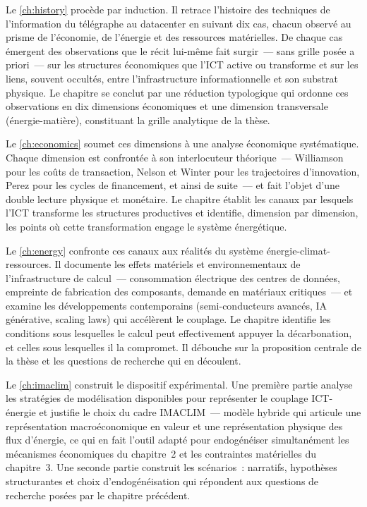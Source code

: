 Le \autoref{ch:history} procède par induction. Il retrace l'histoire des techniques de l'information du télégraphe au datacenter en suivant dix cas, chacun observé au prisme de l'économie, de l'énergie et des ressources matérielles. De chaque cas émergent des observations que le récit lui-même fait surgir~--- sans grille posée a priori~--- sur les structures économiques que l'ICT active ou transforme et sur les liens, souvent occultés, entre l'infrastructure informationnelle et son substrat physique. Le chapitre se conclut par une réduction typologique qui ordonne ces observations en dix dimensions économiques et une dimension transversale (énergie-matière), constituant la grille analytique de la thèse.

Le \autoref{ch:economics} soumet ces dimensions à une analyse économique systématique. Chaque dimension est confrontée à son interlocuteur théorique~--- Williamson pour les coûts de transaction, Nelson et Winter pour les trajectoires d'innovation, Perez pour les cycles de financement, et ainsi de suite~--- et fait l'objet d'une double lecture physique et monétaire. Le chapitre établit les canaux par lesquels l'ICT transforme les structures productives et identifie, dimension par dimension, les points où cette transformation engage le système énergétique.

Le \autoref{ch:energy} confronte ces canaux aux réalités du système énergie-climat-ressources. Il documente les effets matériels et environnementaux de l'infrastructure de calcul~--- consommation électrique des centres de données, empreinte de fabrication des composants, demande en matériaux critiques~--- et examine les développements contemporains (semi-conducteurs avancés, IA générative, scaling laws) qui accélèrent le couplage. Le chapitre identifie les conditions sous lesquelles le calcul peut effectivement appuyer la décarbonation, et celles sous lesquelles il la compromet. Il débouche sur la proposition centrale de la thèse et les questions de recherche qui en découlent.

Le \autoref{ch:imaclim} construit le dispositif expérimental. Une première partie analyse les stratégies de modélisation disponibles pour représenter le couplage ICT-énergie et justifie le choix du cadre IMACLIM~--- modèle hybride qui articule une représentation macroéconomique en valeur et une représentation physique des flux d'énergie, ce qui en fait l'outil adapté pour endogénéiser simultanément les mécanismes économiques du chapitre~2 et les contraintes matérielles du chapitre~3. Une seconde partie construit les scénarios~: narratifs, hypothèses structurantes et choix d'endogénéisation qui répondent aux questions de recherche posées par le chapitre précédent.

